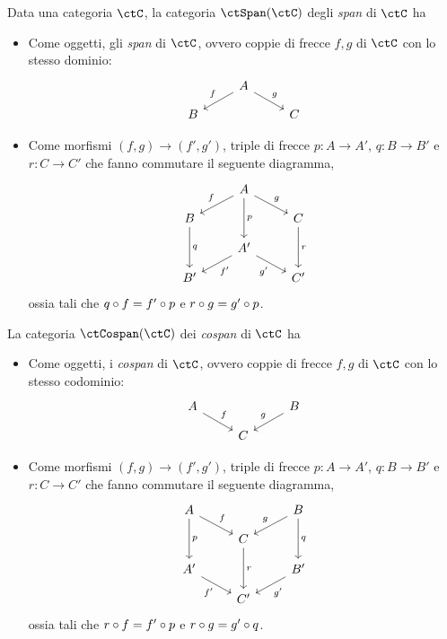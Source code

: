 \begin{definition}\label{def_span_e_cospan}
	Data una categoria \(\ctC\), la categoria $\ctSpan(\ctC)$ degli \emph{span} di \(\ctC\) ha
	\begin{itemize}
		\item Come oggetti, gli \emph{span} di \(\ctC\), ovvero coppie di frecce \(f,g\) di \(\ctC\) con lo stesso dominio:
		      \[
			      \begin{tikzcd}[row sep=small]
				      & A \ar{dl}[swap]{f} \ar{dr}{g} \\
				      B && C
			      \end{tikzcd}
		      \]
		\item Come morfismi \((f,g)\to (f',g')\), triple di frecce \(p:A\to A'\), \(q:B\to B'\) e \(r:C\to C'\) che fanno commutare il seguente diagramma,
		      \[
			      \begin{tikzcd}[row sep=small]
				      & A \ar{dd}{p} \ar{dl}[swap]{f} \ar{dr}{g} \\
				      B \ar{dd}{q} && C \ar{dd}{r} \\
				      & A' \ar{dl}{f'} \ar{dr}[swap]{g'} \\
				      B' && C'
			      \end{tikzcd}
		      \]
		      ossia tali che \(q\circ f=f'\circ p\) e \(r\circ g=g'\circ p\).
	\end{itemize}

	La categoria $\ctCospan(\ctC)$ dei \emph{cospan} di \(\ctC\) ha
	\begin{itemize}
		\item Come oggetti, i \emph{cospan} di \(\ctC\), ovvero coppie di frecce \(f,g\) di \(\ctC\) con lo stesso codominio:
		      \[
			      \begin{tikzcd}[row sep=small]
				      A \ar{dr}{f} && B \ar{dl}[swap]{g} \\
				      & C
			      \end{tikzcd}
		      \]
		\item Come morfismi \((f,g)\to (f',g')\), triple di frecce \(p:A\to A'\), \(q:B\to B'\) e \(r:C\to C'\) che fanno commutare il seguente diagramma,
		      \[
			      \begin{tikzcd}[row sep=small]
				      A \ar{dd}{p} \ar{dr}{f} && B \ar{dd}{q} \ar{dl}[swap]{g} \\
				      & C \ar{dd}{r} \\
				      A' \ar{dr}[swap]{f'} && B' \ar{dl}{g'} \\
				      & C'
			      \end{tikzcd}
		      \]
		      ossia tali che \(r\circ f=f'\circ p\) e \(r\circ g=g'\circ q\).
	\end{itemize}
\end{definition}
